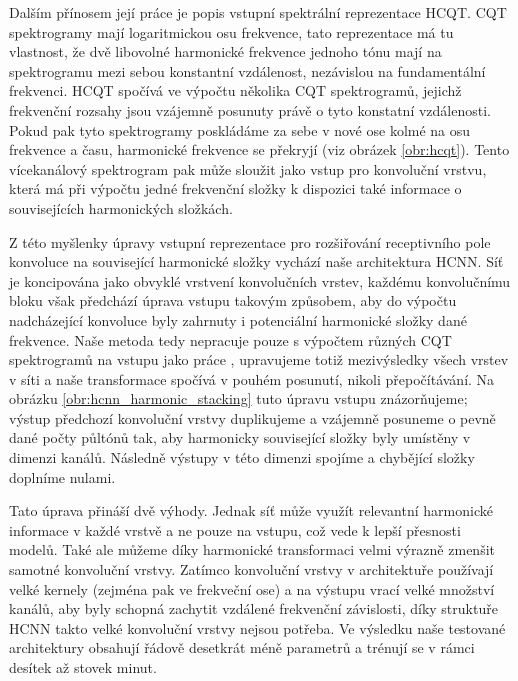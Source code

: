 Dalším přínosem její práce je popis vstupní spektrální reprezentace HCQT. CQT spektrogramy mají logaritmickou osu frekvence, tato reprezentace má tu vlastnost, že dvě libovolné harmonické frekvence jednoho tónu mají na spektrogramu mezi sebou konstantní vzdálenost, nezávislou na fundamentální frekvenci. HCQT spočívá ve výpočtu několika CQT spektrogramů, jejichž frekvenční rozsahy jsou vzájemně posunuty právě o tyto konstatní vzdálenosti. Pokud pak tyto spektrogramy poskládáme za sebe v nové ose kolmé na osu frekvence a času, harmonické frekvence se překryjí (viz obrázek \ref{obr:hcqt}). Tento vícekanálový spektrogram pak může sloužit jako vstup pro konvoluční vrstvu, která má při výpočtu jedné frekvenční složky k dispozici také informace o souvisejících harmonických složkách.

Z této myšlenky úpravy vstupní reprezentace pro rozšiřování receptivního pole konvoluce na související harmonické složky vychází naše architektura HCNN. Síť je koncipována jako obvyklé vrstvení konvolučních vrstev, každému konvolučnímu bloku však předchází úprava vstupu takovým způsobem, aby do výpočtu nadcházející konvoluce byly zahrnuty i potenciální harmonické složky dané frekvence. Naše metoda tedy nepracuje pouze s výpočtem různých CQT spektrogramů na vstupu jako práce \cite{Bittner2017}, upravujeme totiž mezivýsledky všech vrstev v síti a naše transformace spočívá v pouhém posunutí, nikoli přepočítávání. Na obrázku \ref{obr:hcnn_harmonic_stacking} tuto úpravu vstupu znázorňujeme; výstup předchozí konvoluční vrstvy duplikujeme a vzájemně posuneme o pevně dané počty půltónů tak, aby harmonicky související složky byly umístěny  v dimenzi kanálů. Následně výstupy v této dimenzi spojíme a chybějící složky doplníme nulami.

Tato úprava přináší dvě výhody. Jednak síť může využít relevantní harmonické informace v každé vrstvě a ne pouze na vstupu, což vede k lepší přesnosti modelů. Také ale můžeme díky harmonické transformaci velmi výrazně zmenšit samotné konvoluční vrstvy. Zatímco konvoluční vrstvy v architektuře \cite{Bittner2017} používají velké kernely (zejména pak ve frekveční ose) a na výstupu vrací velké množství kanálů, aby byly schopná zachytit vzdálené frekvenční závislosti, díky struktuře HCNN takto velké konvoluční vrstvy nejsou potřeba. Ve výsledku naše testované architektury obsahují řádově desetkrát méně parametrů a trénují se v rámci desítek až stovek minut.

